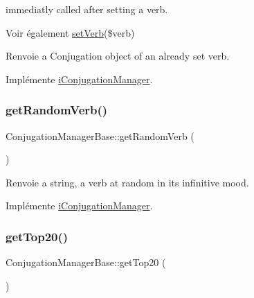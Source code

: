 immediatly called after setting a verb. 

\begin{DoxySeeAlso}{Voir également}
\hyperlink{classConjugationManagerBase_a36a53a9f0bc2114a5429bcf9e3cd351e}{set\+Verb}(\$verb) 
\end{DoxySeeAlso}
\begin{DoxyReturn}{Renvoie}
a Conjugation object of an already set verb. 
\end{DoxyReturn}


Implémente \hyperlink{interfaceiConjugationManager_afba24324d7c48d3ab00ffba63cbc1b9e}{i\+Conjugation\+Manager}.

\hypertarget{classConjugationManagerBase_ac2e82ace9b19d7b014908ec275b552bc}{}\label{classConjugationManagerBase_ac2e82ace9b19d7b014908ec275b552bc} 
\subsubsection{\texorpdfstring{get\+Random\+Verb()}{getRandomVerb()}}
{\footnotesize\ttfamily Conjugation\+Manager\+Base\+::get\+Random\+Verb (\begin{DoxyParamCaption}{ }\end{DoxyParamCaption})}

\begin{DoxyReturn}{Renvoie}
a string, a verb at random in its infinitive mood. 
\end{DoxyReturn}


Implémente \hyperlink{interfaceiConjugationManager_a2e955e8c88d45869683005343cbfac60}{i\+Conjugation\+Manager}.

\hypertarget{classConjugationManagerBase_a63728ecfb3a2eb259accf59dd79e9c26}{}\label{classConjugationManagerBase_a63728ecfb3a2eb259accf59dd79e9c26} 
\subsubsection{\texorpdfstring{get\+Top20()}{getTop20()}}
{\footnotesize\ttfamily Conjugation\+Manager\+Base\+::get\+Top20 (\begin{DoxyParamCaption}{ }\end{DoxyParamCaption})}

